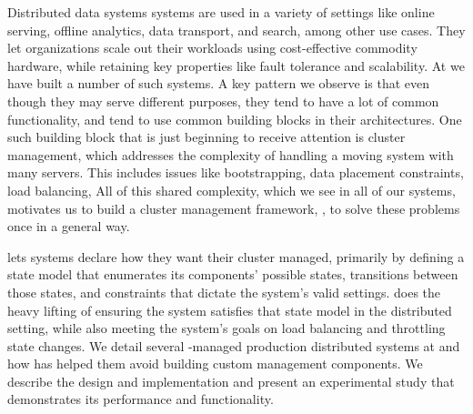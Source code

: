 Distributed data systems systems are used in a variety of
settings like online serving, offline analytics, data 
transport, and search, among other use cases.  They let organizations scale out their 
workloads using cost-effective commodity hardware, while retaining key properties 
like fault tolerance and scalability.  At \linkedin we have built a number of
such systems.  A key pattern we observe is that even though they may serve different purposes, 
they tend to have a lot of common functionality, and tend to use common building blocks 
in their architectures.  One such building block that is just beginning to
receive attention is cluster management, which addresses 
the complexity of handling a moving system with many servers.  This includes
issues like bootstrapping, data placement constraints, load balancing, \etc  
All of this shared complexity, which we see in all of our systems, motivates us
to build a cluster management framework, \helix, to solve these problems once in a
general way.

\helix lets systems declare how they want their cluster
managed, primarily by defining a state model that enumerates its
components' possible states, transitions between those states,
and constraints that dictate the system's valid settings.  \helix does the heavy lifting of
ensuring the system satisfies that state model in the distributed setting,
while also meeting the system's goals on load balancing and throttling state
changes.
We detail several \helix-managed production distributed systems 
at \linkedin and how \helix has helped them avoid building custom management components.  
We describe the \helix design and implementation and present an experimental
study that demonstrates its performance and functionality.

